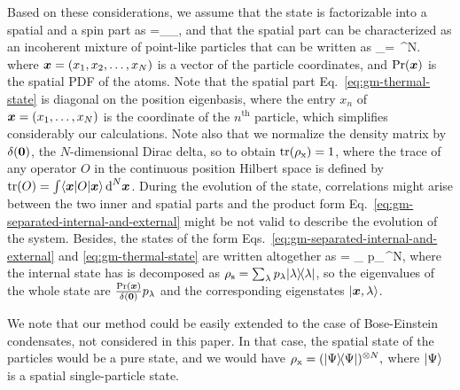 Based on these considerations, we assume that the state is factorizable into a spatial and a spin part as
\be
\label{eq:gm-separated-internal-and-external}
\rho=\rho_{}\otimes\rho_{},
\ee
and that the spatial part can be characterized as an incoherent mixture of point-like particles that can be written as
\be
  \label{eq:gm-thermal-state}
  \rho_{}=\int {} \,^N.
\ee
where $\boldsymbol{x}=(x_1,x_2,\dots,x_N)$ is a vector of the particle coordinates, and $\text{Pr}(\boldsymbol{x})$ is the spatial PDF of the atoms.
Note that the spatial part Eq.~\eqref{eq:gm-thermal-state} is diagonal on the position eigenbasis, where the entry $x_n$ of $\boldsymbol{x} =(x_1,\dots,x_N)$ is the coordinate of the $n^{\text{th}}$ particle, which simplifies considerably our calculations.
Note also that we normalize the density matrix by $\delta(\boldsymbol{0})$, the $N$-dimensional Dirac delta, so to obtain $\operatorname{tr}(\rho_{\text{x}})=1$, where the trace of any operator $O$ in the continuous position Hilbert space is defined by $\operatorname{tr}(O)=\int \langle{\ensuremath{\boldsymbol{x}}}\vert{O}\vert{\ensuremath{\boldsymbol{x}}}\rangle\,\text{d}^N\boldsymbol{x}$.
During the evolution of the state, correlations might arise between the two inner and spatial parts and the product form Eq.~\eqref{eq:gm-separated-internal-and-external} might be not valid to describe the evolution of the system.
Besides, the states of the form Eqs.~\eqref{eq:gm-separated-internal-and-external} and \eqref{eq:gm-thermal-state} are written altogether as
\be
  \rho = \int \sum_{\lambda} p_\lambda {}\,^N,
  \label{eq:gm-eigendecomposition-of-state}
\ee
where the internal state has is decomposed as $\rho_{\text{s}}=\sum_{\lambda}p_\lambda\vert{\lambda}\rangle{\!}\langle{\lambda}\vert$, so the eigenvalues of the whole state are $\frac{\text{Pr}(\boldsymbol{x})}{\delta(\boldsymbol{0})}p_\lambda$ and the corresponding eigenstates $\vert{\ensuremath{\boldsymbol{x}},\lambda}\rangle$.

We note that our method could be easily extended to the case of Bose-Einstein condensates, not considered in this paper. In that case, the spatial state of the particles would be a pure state, and we would have $\rho_{\text{x}}=(\vert{\Psi}\rangle{\!}\langle{\Psi}\vert)^{\otimes N},$ where $\vert{\Psi}\rangle$ is a spatial single-particle state.

